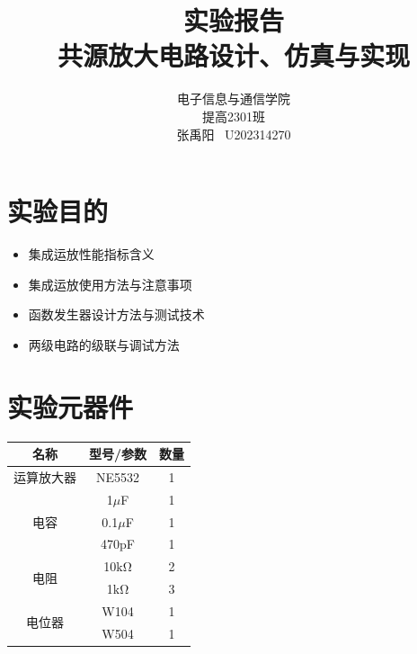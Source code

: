 \documentclass[a4paper,11pt,UTF8]{article}
\begin{document}
\title{\huge 实验报告 \\ 共源放大电路设计、仿真与实现}
\author{电子信息与通信学院 \\ 提高2301班 \\ 张禹阳 \ U202314270}

\maketitle

\begin{figure}[H]
	\centering
\end{figure}

\tableofcontents\newpage

\section{实验目的}

\begin{itemize}
    \item 集成运放性能指标含义
	\item 集成运放使用方法与注意事项
	\item 函数发生器设计方法与测试技术
	\item 两级电路的级联与调试方法
\end{itemize}

\section{实验元器件}

\begin{table}[H]
	\centering
	\begin{tabular}{|c|c|c|}
		\hline
		名称 & 型号/参数 & 数量 \\
		\hline
		运算放大器 & NE5532 & 1 \\
		\hline
		\multirow{3}{*}{电容} & 1$\mu$F & 1 \\
		\cline{2-3}
		& 0.1$\mu$F & 1 \\
        \cline{2-3}
        & 470pF & 1 \\
		\hline
		\multirow{2}{*}{电阻} & 10$\mathrm{k\Omega}$ & 2 \\
		\cline{2-3}
		& 1$\mathrm{k\Omega}$ & 3 \\
        \hline
        \multirow{2}{*}{电位器} & W104 & 1 \\
        \cline{2-3}
        & W504 & 1 \\
		\hline
	\end{tabular}
\end{table}
\end{document}
